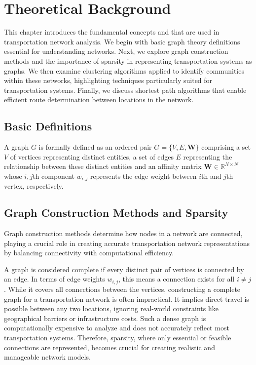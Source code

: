 \chapter{Theoretical Background}
\label{ch:basics}
This chapter introduces the fundamental concepts and that are used in transportation network analysis. We begin with basic graph theory definitions essential for understanding networks. Next, we explore graph construction methods and the importance of sparsity in representing transportation systems as graphs. We then examine clustering algorithms applied to identify communities within these networks, highlighting techniques particularly suited for transportation systems. Finally, we discuss shortest path algorithms that enable efficient route determination between locations in the network.
\section{Basic Definitions}
\label{se:BasicDefinitions}

A graph $G$ is formally defined as an ordered pair $G = \{V, E, \mathbf{W}\}$ comprising a set $V$ of vertices representing distinct entities, a set of edges $E$ representing the relationship between these distinct entities and an affinity matrix $\mathbf{W}\in\mathbb{R}^{N\times N}$ whose $i,j$th component $w_{i,j}$ represents the edge weight between $i$th and $j$th vertex, respectively.


\section{Graph Construction Methods and Sparsity}
\label{se:GraphConstructionMethodsAndSparsity}

Graph construction methods determine how nodes in a network are connected, playing a crucial role in creating accurate transportation network representations by balancing connectivity with computational efficiency.

A graph is considered complete if every distinct pair of vertices is connected by an edge. In terms of edge weights \(w_{i,j}\), this means a connection exists for all \(i \neq j\). While it covers all connections between the vertices, constructing a complete graph for a transportation network is often impractical. It implies direct travel is possible between any two locations, ignoring real-world constraints like geographical barriers or infrastructure costs. Such a dense graph is computationally expensive to analyze and does not accurately reflect most transportation systems. Therefore, sparsity, where only essential or feasible connections are represented, becomes crucial for creating realistic and manageable network models.

